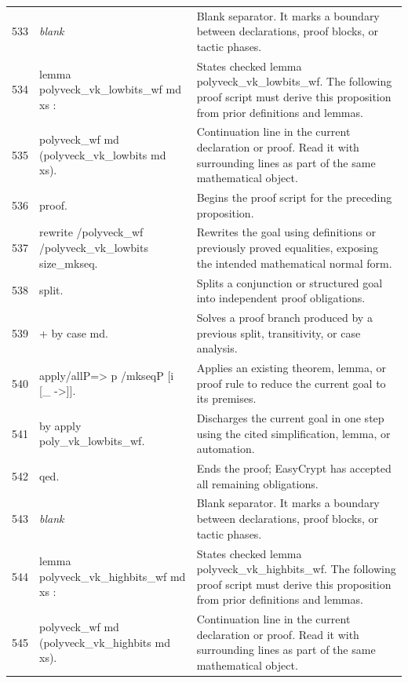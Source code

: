 \documentclass[10pt]{article}
\begin{document}
\begin{longtable}{r L{0.53\textwidth} L{0.37\textwidth}}
533 & {\ttfamily\scriptsize \emph{blank}} & Blank separator.  It marks a boundary between declarations, proof blocks, or tactic phases. \\
534 & {\ttfamily\scriptsize lemma polyveck\_vk\_lowbits\_wf md xs :} & States checked lemma polyveck\_vk\_lowbits\_wf.  The following proof script must derive this proposition from prior definitions and lemmas. \\
535 & {\ttfamily\scriptsize   polyveck\_wf md (polyveck\_vk\_lowbits md xs).} & Continuation line in the current declaration or proof.  Read it with surrounding lines as part of the same mathematical object. \\
536 & {\ttfamily\scriptsize proof.} & Begins the proof script for the preceding proposition. \\
537 & {\ttfamily\scriptsize rewrite /polyveck\_wf /polyveck\_vk\_lowbits size\_mkseq.} & Rewrites the goal using definitions or previously proved equalities, exposing the intended mathematical normal form. \\
538 & {\ttfamily\scriptsize split.} & Splits a conjunction or structured goal into independent proof obligations. \\
539 & {\ttfamily\scriptsize + by case md.} & Solves a proof branch produced by a previous split, transitivity, or case analysis. \\
540 & {\ttfamily\scriptsize apply/allP=> p /mkseqP [i [\_ ->]].} & Applies an existing theorem, lemma, or proof rule to reduce the current goal to its premises. \\
541 & {\ttfamily\scriptsize by apply poly\_vk\_lowbits\_wf.} & Discharges the current goal in one step using the cited simplification, lemma, or automation. \\
542 & {\ttfamily\scriptsize qed.} & Ends the proof; EasyCrypt has accepted all remaining obligations. \\
543 & {\ttfamily\scriptsize \emph{blank}} & Blank separator.  It marks a boundary between declarations, proof blocks, or tactic phases. \\
544 & {\ttfamily\scriptsize lemma polyveck\_vk\_highbits\_wf md xs :} & States checked lemma polyveck\_vk\_highbits\_wf.  The following proof script must derive this proposition from prior definitions and lemmas. \\
545 & {\ttfamily\scriptsize   polyveck\_wf md (polyveck\_vk\_highbits md xs).} & Continuation line in the current declaration or proof.  Read it with surrounding lines as part of the same mathematical object. \\

\end{longtable}
\end{document}
